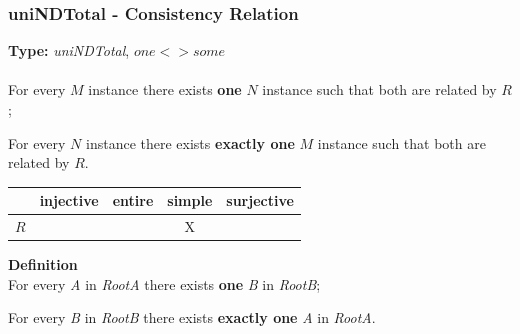 \documentclass{beamer}
\newcommand{\cmark}{\ding{51}}%
\begin{document}
\begin{frame}
\frametitle{uniNDTotal - \textbf{Consistency Relation}}

\textbf{Type:} \textit{uniNDTotal},  $one <> some$\\

~\\
For every $M$ instance there
exists \textbf{one} $N$ instance such that both are related by $R$;

For every $N$ instance there
exists \textbf{exactly one} $M$ instance such that both are related by $R$.

\begin{center}
\begin{tabular}{| c | c | c | c | c | }
  \hline                        
   & injective & entire & simple & surjective \\
  \hline 
  $R$ & \cmark & \cmark & X & \cmark\\
  \hline  
\end{tabular}
\end{center}


\textbf{Definition}\\

For every \textit{A} in \textit{RootA} there
exists \textbf{one} \textit{B} in \textit{RootB};


For every \textit{B} in \textit{RootB} there
exists \textbf{exactly one} \textit{A} in \textit{RootA}.

\end{frame}
\end{document}
